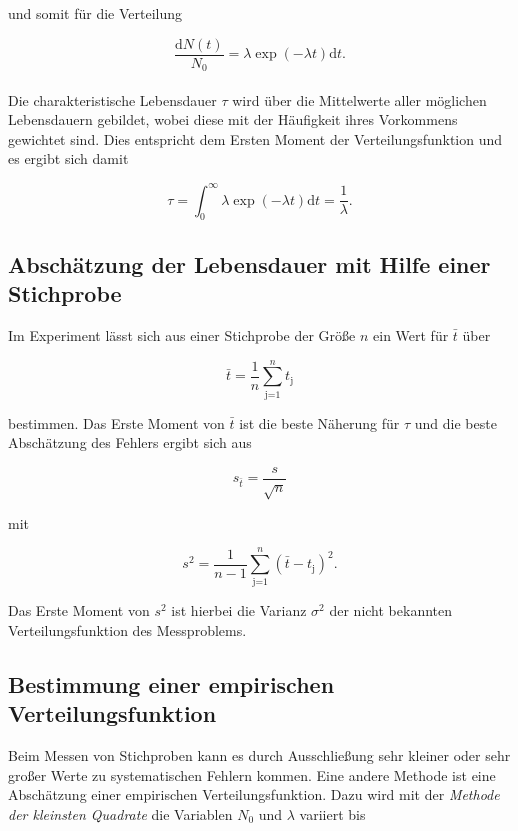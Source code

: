 und somit für die Verteilung
 
\begin{equation}
	\frac{\text{d}N(t)}{N_\text{0}} = \lambda \exp{(-\lambda t)} \text{d}t .
\end{equation}
\\
Die charakteristische Lebensdauer $\tau$ wird über die Mittelwerte aller möglichen Lebensdauern gebildet, wobei diese mit der Häufigkeit ihres Vorkommens gewichtet sind.
Dies entspricht dem Ersten Moment der Verteilungsfunktion und es ergibt sich damit

\begin{equation}
	\tau = \int_\text{0}^\infty \lambda \exp{(-\lambda t)} \text{d}t = \frac{1}{\lambda} .
\end{equation}
\FloatBarrier
\subsection{Abschätzung der Lebensdauer mit Hilfe einer Stichprobe} %
\label{sub:abschaetzung_der_lebensdauer_mit_hilfe_einer_stichprobe}

Im Experiment lässt sich aus einer Stichprobe der Größe $n$ ein Wert für $\bar{t}$ über

\begin{equation}
	\bar{t} = \frac{1}{n} \sum_{\text{j=1}}^n t_\text{j}
\end{equation}

bestimmen.
Das Erste Moment von $\bar{t}$ ist die beste Näherung für $\tau$ und die beste Abschätzung des Fehlers ergibt sich aus

\begin{equation}
	s_{\bar{t}} = \frac{s}{\sqrt{n}}
\end{equation}

mit

\begin{equation}
	s^2 = \frac{1}{n-1} \sum_\text{j=1}^n \left(\bar{t} - t_\text{j}\right)^2 .
\end{equation}


Das Erste Moment von $s^2$ ist hierbei die Varianz $\sigma^2$ der nicht bekannten Verteilungsfunktion des Messproblems.
\FloatBarrier
\subsection{Bestimmung einer empirischen Verteilungsfunktion} %
\label{sub:bestimmung_einer_empirischen_verteilungsfunktion}


Beim Messen von Stichproben kann es durch Ausschließung sehr kleiner oder sehr großer Werte zu systematischen Fehlern kommen.
Eine andere Methode ist eine Abschätzung einer empirischen Verteilungsfunktion.
Dazu wird mit der \textit{Methode der kleinsten Quadrate} die Variablen $N_\text{0}$ und $\lambda$ variiert bis

